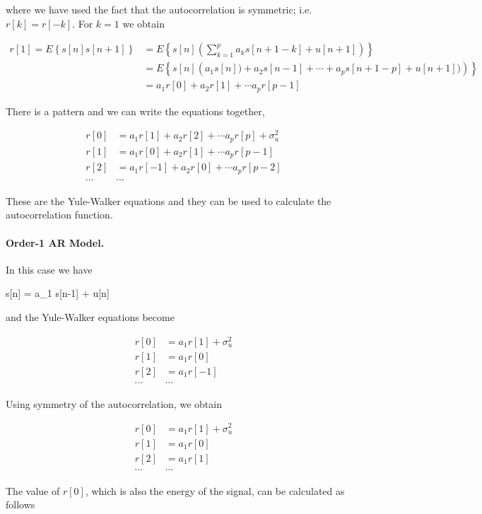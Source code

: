 where we have used the fact that the autocorrelation is symmetric; i.e. $r[k] = r[-k]$. For $k = 1$ we obtain

\begin{align*}
r[1] = E\left\{ s[n] s[n+1] \right\} &= E\left\{ s[n] \left( \sum_{k=1}^p a_k s[n+1-k] + u[n+1] \right) \right\} \\
&= E\left\{ s[n] \left( a_1 s[n]) + a_2 s[n-1] + \cdots + a_p s[n+1-p] + u[n+1]) \right) \right\} \\
&= a_1 r[0] + a_2 r[1] + \cdots a_p r[p-1]
\end{align*}

There is a pattern and we can write the equations together,

\begin{align*}
r[0] &= a_1 r[1] + a_2 r[2] + \cdots a_p r[p] + \sigma_u^2 \\
r[1] &= a_1 r[0] + a_2 r[1] + \cdots a_p r[p-1] \\
r[2] &= a_1 r[-1] + a_2 r[0] + \cdots a_p r[p-2] \\
\cdots & \cdots
\end{align*}

These are the Yule-Walker equations and they can be used to calculate the autocorrelation function.

\paragraph{Order-1 AR Model.} In this case we have

\bee
s[n] = a_1 s[n-1] + u[n]
\eee

and the Yule-Walker equations become

\begin{align*}
r[0] &= a_1 r[1] + \sigma_u^2 \\
r[1] &= a_1 r[0] \\
r[2] &= a_1 r[-1] \\
\cdots & \cdots
\end{align*}

Using symmetry of the autocorrelation, we obtain

\begin{align*}
r[0] &= a_1 r[1] + \sigma_u^2 \\
r[1] &= a_1 r[0] \\
r[2] &= a_1 r[1] \\
\cdots & \cdots
\end{align*}

The value of $r[0]$, which is also the energy of the signal, can be calculated as follows


